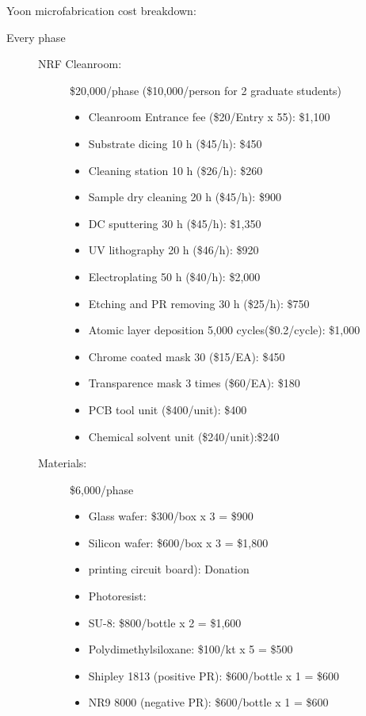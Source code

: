 Yoon microfabrication cost breakdown:
\begin{description}
\item [Every phase]
  \begin{description}
\item [NRF Cleanroom:] \$20,000/phase (\$10,000/person for 2 graduate students) 
  \begin{itemize}
  \item Cleanroom Entrance fee (\$20/Entry x 55): \$1,100
  \item Substrate dicing 10 h (\$45/h): \$450
  \item Cleaning station 10 h (\$26/h): \$260
  \item Sample dry cleaning 20 h (\$45/h): \$900
  \item DC sputtering 30 h (\$45/h): \$1,350
  \item UV lithography 20 h (\$46/h): \$920
  \item Electroplating 50 h (\$40/h): \$2,000
  \item Etching and PR removing 30 h (\$25/h): \$750
  \item Atomic layer deposition 5,000 cycles(\$0.2/cycle): \$1,000
  \item Chrome coated mask 30 (\$15/EA): \$450
  \item Transparence mask 3 times (\$60/EA): \$180
  \item PCB tool unit (\$400/unit): \$400
  \item Chemical solvent unit (\$240/unit):\$240
  \end{itemize}
\item [Materials:] \$6,000/phase
  \begin{itemize}
  \item Glass wafer: \$300/box x 3 = \$900
  \item Silicon wafer: \$600/box x 3 = \$1,800
  \item printing circuit board): Donation
  \item Photoresist:
  \item SU-8: \$800/bottle x 2 = \$1,600
  \item Polydimethylsiloxane: \$100/kt x 5 = \$500
  \item Shipley 1813 (positive PR): \$600/bottle x 1 = \$600
  \item NR9 8000 (negative PR): \$600/bottle x 1 = \$600
  \end{itemize}
  \end{description}
\end{description}

